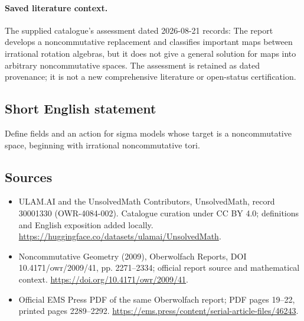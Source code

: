 \documentclass[11pt]{article}
\begin{document}
\paragraph{Saved literature context.} The supplied catalogue's assessment dated 2026-08-21 records: The report develops a noncommutative replacement and classifies important maps between irrational rotation algebras, but it does not give a general solution for maps into arbitrary noncommutative spaces. The assessment is retained as dated provenance; it is not a new comprehensive literature or open-status certification.
\subsection{Short English statement}
Define fields and an action for sigma models whose target is a noncommutative space, beginning with irrational noncommutative tori.
\subsection{Sources}
\begin{itemize}
\item[\hypertarget{source:30001330:1}{S1}] ULAM.AI and the UnsolvedMath Contributors, UnsolvedMath, record 30001330 (OWR-4084-002). Catalogue curation under CC BY 4.0; definitions and English exposition added locally.
\url{https://huggingface.co/datasets/ulamai/UnsolvedMath}.
\item[\hypertarget{source:30001330:2}{S2}] Noncommutative Geometry (2009), Oberwolfach Reports, DOI 10.4171/owr/2009/41, pp. 2271--2334; official report source and mathematical context.
\url{https://doi.org/10.4171/owr/2009/41}.
\item[\hypertarget{source:30001330:3}{S3}] Official EMS Press PDF of the same Oberwolfach report; PDF pages 19--22, printed pages 2289--2292.
\url{https://ems.press/content/serial-article-files/46243}.
\end{itemize}
\label{end:30001330}
\end{document}
